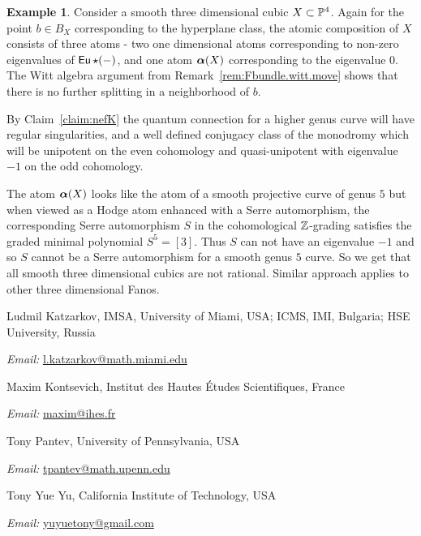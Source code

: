 \documentclass[twoside,leqno]{article}
\numberwithin{equation}{section}
\theoremstyle{plain}
\theoremstyle{definition}
\newtheorem{example}[equation]{Example}
\begin{document}
\begin{example} Consider  a smooth three dimensional cubic
$X \subset \mathbb P^4$.  Again for the point $b \in B_{X}$ corresponding to the hyperplane class, the  atomic composition of $X$ consists of three atoms - two one dimensional atoms corresponding to non-zero eigenvalues of $\operatorname{\mathsf{Eu}}\star (-)$, and one atom $\boldsymbol{\alpha}(X)$ corresponding to the eigenvalue $0$. The Witt algebra argument from Remark~\ref{rem:Fbundle.witt.move} shows that there is no further  splitting in a neighborhood of $b$.



By Claim~\ref{claim:nefK}  the quantum connection for a higher genus curve will have regular singularities, and a well defined conjugacy class of the  monodromy which will be unipotent on the even cohomology and quasi-unipotent with eigenvalue $-1$ on the odd cohomology.   


The atom $\boldsymbol{\alpha}(X)$  looks like the atom of a smooth projective curve of genus $5$  but  when viewed as a Hodge atom enhanced with a Serre automorphism, the corresponding Serre automorphism $S$ in the cohomological $\mathbb Z$-grading satisfies the graded minimal polynomial  
$S^5 = [3]$. Thus $S$ can not have an eigenvalue $-1$ and so $S$  cannot be  a Serre automorphism for a smooth genus $5$ curve. So we get that all  smooth  three dimensional cubics  are not rational. Similar approach applies to other three dimensional Fanos.
\end{example}




\bigskip

Ludmil Katzarkov, IMSA, University of Miami, USA; ICMS, IMI, Bulgaria; 
HSE University, Russia

\emph{Email:} \url{l.katzarkov@math.miami.edu}

\medskip

Maxim Kontsevich, Institut des Hautes Études Scientifiques, France

\emph{Email:} \url{maxim@ihes.fr}

\medskip

Tony Pantev, University of Pennsylvania, USA

\emph{Email:} \url{tpantev@math.upenn.edu}

\medskip

Tony Yue Yu, California Institute of Technology, USA

\emph{Email:} \url{yuyuetony@gmail.com}
\end{document}
